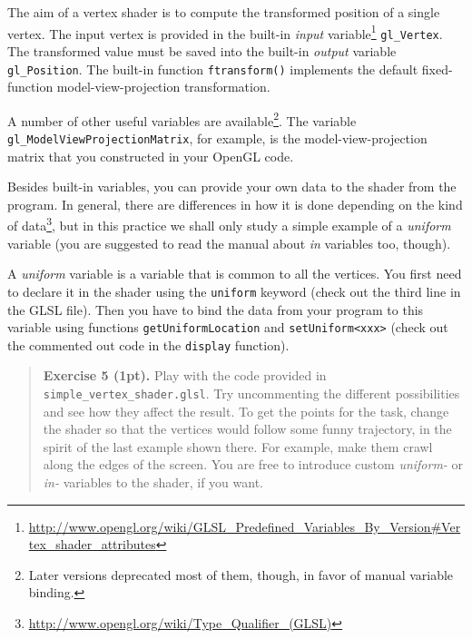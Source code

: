 \documentclass{article}
\newenvironment{exercise}[2]{\begin{verse}\textbf{Exercise #1 (#2pt).} }{
\end{verse}\medskip}
\begin{document}
The aim of a vertex shader is to compute the transformed position of a single vertex. The input vertex is provided in the built-in \emph{input} variable\footnote{\url{http://www.opengl.org/wiki/GLSL_Predefined_Variables_By_Version\#Vertex_shader_attributes}} \verb#gl_Vertex#. The transformed value must be saved into the built-in \emph{output} variable \verb#gl_Position#. The built-in function \verb#ftransform()# implements the default fixed-function model-view-projection transformation.

A number of other useful variables are available\footnote{Later versions deprecated most of them, though, in favor of manual variable binding.}. The variable\\ \verb#gl_ModelViewProjectionMatrix#, for example, is the model-view-projection matrix that you constructed in your OpenGL code.

Besides built-in variables, you can provide your own data to the shader from the program. In general, there are differences in how it is done depending on the kind of data\footnote{\url{http://www.opengl.org/wiki/Type_Qualifier_(GLSL)}}, but in this practice we shall only study a simple example of a \emph{uniform} variable (you are suggested to read the manual about \emph{in} variables too, though).

A \emph{uniform} variable is a variable that is common to all the vertices. You first need to declare it in the shader using the \texttt{uniform} keyword (check out the third line in the GLSL file). Then you have to bind the data from your program to this variable using functions \texttt{getUniformLocation} and \texttt{setUniform<xxx>} (check out the commented out code in the \texttt{display} function).

\begin{exercise}{5}{1}
Play with the code provided in \\ \noindent\verb#simple_vertex_shader.glsl#. Try uncommenting the different possibilities and see how they affect the result. To get the points for the task, change the shader so that the vertices would follow some funny trajectory, in the spirit of the last example shown there. For example, make them crawl along the edges of the screen. You are free to introduce custom \emph{uniform-} or \emph{in-} variables to the shader, if you want.
\end{exercise}
\end{document}
